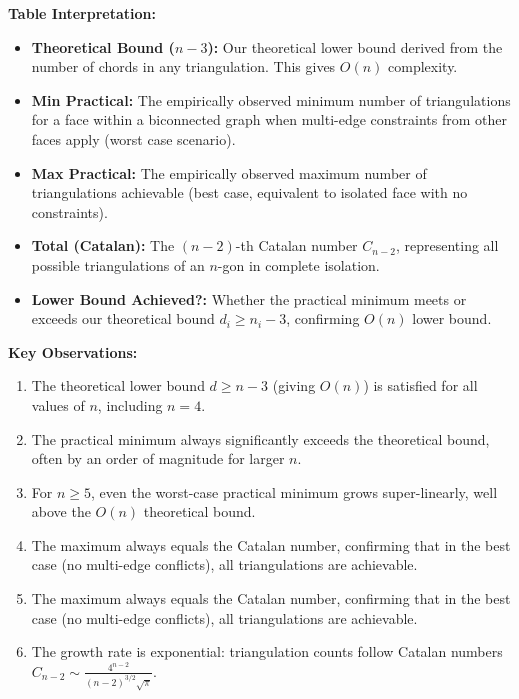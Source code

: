 \documentclass[12pt,a4paper]{article}
\theoremstyle{definition}
\theoremstyle{remark}
\begin{document}
\textbf{Table Interpretation:}
\begin{itemize}
    \item \textbf{Theoretical Bound ($n-3$):} Our theoretical lower bound derived from the number of chords in any triangulation. This gives $O(n)$ complexity.
    \item \textbf{Min Practical:} The empirically observed minimum number of triangulations for a face within a biconnected graph when multi-edge constraints from other faces apply (worst case scenario).
    \item \textbf{Max Practical:} The empirically observed maximum number of triangulations achievable (best case, equivalent to isolated face with no constraints).
    \item \textbf{Total (Catalan):} The $(n-2)$-th Catalan number $C_{n-2}$, representing all possible triangulations of an $n$-gon in complete isolation.
    \item \textbf{Lower Bound Achieved?:} Whether the practical minimum meets or exceeds our theoretical bound $d_i \geq n_i - 3$, confirming $O(n)$ lower bound.
\end{itemize}

\textbf{Key Observations:}
\begin{enumerate}
    \item The theoretical lower bound $d \geq n - 3$ (giving $O(n)$) is satisfied for all values of $n$, including $n = 4$.
    \item The practical minimum always significantly exceeds the theoretical bound, often by an order of magnitude for larger $n$.
    \item For $n \geq 5$, even the worst-case practical minimum grows super-linearly, well above the $O(n)$ theoretical bound.
    \item The maximum always equals the Catalan number, confirming that in the best case (no multi-edge conflicts), all triangulations are achievable.
    \item The maximum always equals the Catalan number, confirming that in the best case (no multi-edge conflicts), all triangulations are achievable.
    \item The growth rate is exponential: triangulation counts follow Catalan numbers $C_{n-2} \sim \frac{4^{n-2}}{(n-2)^{3/2}\sqrt{\pi}}$.
\end{enumerate}
\end{document}
